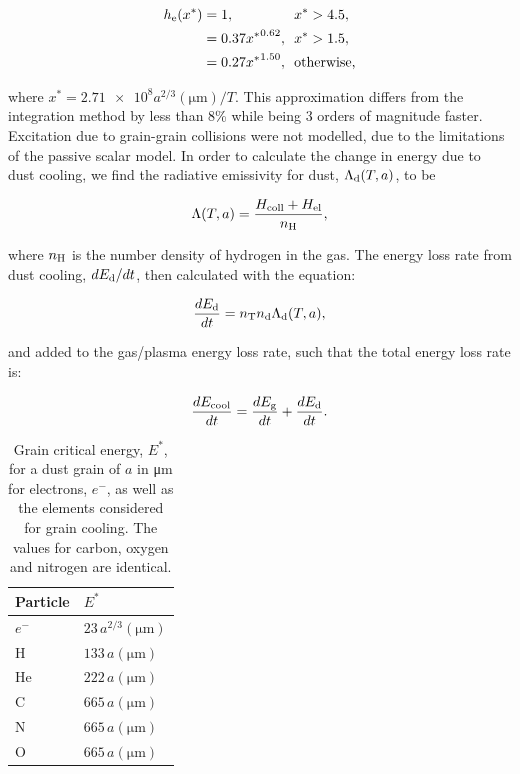 \begin{equation}
  \begin{alignedat}{3}
    h_\text{e}(x^*) & = 1 ,                && ~~ x^* > 4.5, \\
             & = 0.37{x^*}^{0.62} , && ~~ x^* > 1.5 , \\
             & = 0.27{x^*}^{1.50} , && ~~ \text{otherwise,}
  \end{alignedat}
\end{equation}

\noindent
where $x^* = \num{2.71e8} a^{2/3} (\si{\micro\metre})/T$.
This approximation differs from the integration method by less than 8\% while being 3 orders of magnitude faster.
Excitation due to grain-grain collisions were not modelled, due to the limitations of the passive scalar model.
In order to calculate the change in energy due to dust cooling, we find the radiative emissivity for dust, $\Lambda_\text{d}(T,a)$, to be

\begin{equation}
  \Lambda(T,a) = \frac{H_\text{coll} + H_\text{el}}{n_\text{H}} ,
\end{equation}

\noindent
where $n_\text{H}$ is the number density of hydrogen in the gas.
The energy loss rate from dust cooling, $dE_\text{d}/dt$, then calculated with the equation:

\begin{equation}
  \frac{dE_\text{d}}{dt} = n_\text{T} n_\text{d} \Lambda_\text{d} (T,a) , 
\end{equation}

\noindent
and added to the gas/plasma energy loss rate, such that the total energy loss rate is:

\begin{equation}
  \frac{dE_\text{cool}}{dt} = \frac{dE_\text{g}}{dt} + \frac{dE_\text{d}}{dt} .
\end{equation}

\begin{table}
  \centering
  \begin{tabular}{ll}
    \hline
    Particle & $E^*$ \\
    \hline
    $e^-$ & $23 \, a^{2/3}(\si{\micro\metre})$ \\
    H     & $133 \, a(\si{\micro\metre})$ \\
    He    & $222 \, a(\si{\micro\metre})$ \\
    C     & $665 \, a(\si{\micro\metre})$ \\
    N     & $665 \, a(\si{\micro\metre})$ \\
    O     & $665 \, a(\si{\micro\metre})$ \\
    \hline
  \end{tabular}
  \caption[Grain critical energy]{Grain critical energy, $E^*$, for a dust grain of $a$ in \si{\micro\metre} for electrons, $e^-$, as well as the elements considered for grain cooling. The values for carbon, oxygen and nitrogen are identical.}
  \label{tab:p2-criticalenergy}
\end{table}


